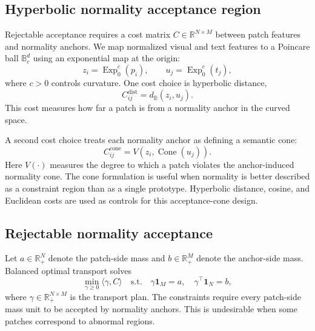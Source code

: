 \documentclass[10pt]{article}
\begin{document}
\subsection{Hyperbolic normality acceptance region}

Rejectable acceptance requires a cost matrix $C \in \mathbb{R}^{N \times M}$ between patch features and normality anchors.
We map normalized visual and text features to a Poincare ball $\mathbb{B}^{d}_{c}$ using an exponential map at the origin:
\begin{equation}
    z_i = \operatorname{Exp}^{c}_{0}(p_i), \qquad
    u_j = \operatorname{Exp}^{c}_{0}(t_j),
\end{equation}
where $c>0$ controls curvature.
One cost choice is hyperbolic distance,
\begin{equation}
    C_{ij}^{\mathrm{dist}} = d_{\mathbb{B}}(z_i, u_j).
\end{equation}
This cost measures how far a patch is from a normality anchor in the curved space.

A second cost choice treats each normality anchor as defining a semantic cone:
\begin{equation}
    C_{ij}^{\mathrm{cone}} = V(z_i, \operatorname{Cone}(u_j)).
\end{equation}
Here $V(\cdot)$ measures the degree to which a patch violates the anchor-induced normality cone.
The cone formulation is useful when normality is better described as a constraint region than as a single prototype.
Hyperbolic distance, cosine, and Euclidean costs are used as controls for this acceptance-cone design.

\subsection{Rejectable normality acceptance}

Let $a \in \mathbb{R}_{+}^{N}$ denote the patch-side mass and $b \in \mathbb{R}_{+}^{M}$ denote the anchor-side mass.
Balanced optimal transport solves
\begin{equation}
    \min_{\gamma \geq 0} \langle \gamma, C \rangle
    \quad
    \mathrm{s.t.}\quad
    \gamma \mathbf{1}_{M}=a,\quad
    \gamma^{\top}\mathbf{1}_{N}=b,
\end{equation}
where $\gamma \in \mathbb{R}_{+}^{N \times M}$ is the transport plan.
The constraints require every patch-side mass unit to be accepted by normality anchors.
This is undesirable when some patches correspond to abnormal regions.
\end{document}

